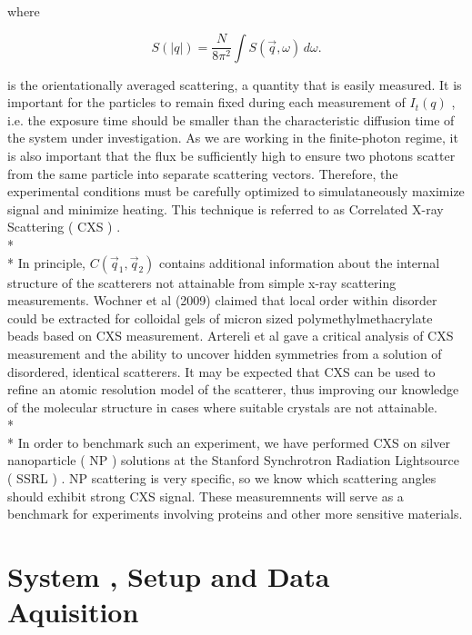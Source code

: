\documentclass[a4paper,12pt]{article}
\begin{document}
where

\begin{equation}
S(|q|) = \frac{N}{8\pi^{2}}  \int S( \vec{q},\omega ) \, d \omega .
\end{equation}

\noindent is the orientationally averaged scattering, a quantity that is easily measured. It is important for the particles to remain fixed during each measurement of $I_{t}( q )$ , i.e. the exposure time should be smaller than the characteristic diffusion time of the system under investigation. As we are working in the finite-photon regime, it is also important that the flux be sufficiently high to ensure two photons scatter from the same particle into separate scattering vectors. Therefore, the experimental conditions must be carefully optimized to simulataneously maximize signal and minimize heating. This technique is referred to as Correlated X-ray Scattering ( CXS ) .
\\*
\\*
In principle, $C( \vec{q}_{1}, \vec{q}_{2})$ contains additional information about the internal structure of the scatterers not attainable from simple x-ray scattering measurements. Wochner et al (2009) claimed that local order within disorder could be extracted for colloidal gels of micron sized polymethylmethacrylate beads based on CXS measurement. Artereli et al gave a critical analysis of CXS measurement and the ability to uncover hidden symmetries from a solution of disordered, identical scatterers. It may be expected that CXS can be used to refine an atomic resolution model of the scatterer, thus improving our knowledge of the molecular structure in cases where suitable crystals are not attainable.
\\*
\\*
\noindent In order to benchmark such an experiment, we have performed CXS on silver nanoparticle ( NP ) solutions at the Stanford Synchrotron Radiation Lightsource ( SSRL ) . NP scattering is very specific, so we know which scattering angles should exhibit strong CXS signal. These measuremnents will serve as a benchmark for experiments involving proteins and other more sensitive materials.  

\section*{System , Setup and Data Aquisition}
\end{document}
